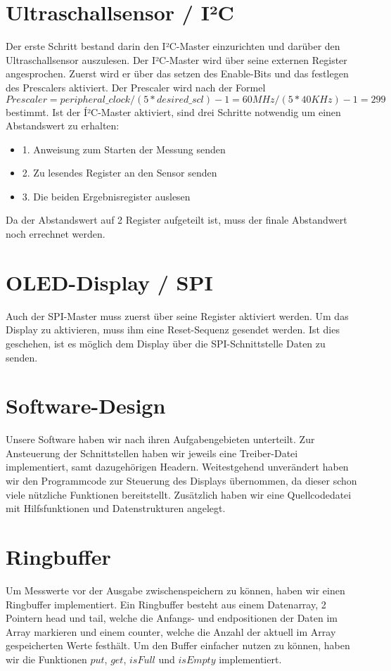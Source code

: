 \documentclass[parskip,
							 oneside,
							 11pt,
							 noheadingspace,
							 accentcolor=tud1d,
							 bigchapter,
							 colorback]{tudreport}
\begin{document}
\section{Ultraschallsensor / I²C}
Der erste Schritt bestand darin den I²C-Master einzurichten und darüber den Ultraschallsensor auszulesen. 
Der I²C-Master wird über seine externen Register angesprochen. Zuerst wird er über das setzen des Enable-Bits und das festlegen des Prescalers aktiviert. Der Prescaler wird nach der Formel $Prescaler = peripheral\_clock / (5 * desired\_scl) - 1 = 60 MHz / (5 * 40 KHz) - 1 = 299$ bestimmt. Ist der Í²C-Master aktiviert, sind drei Schritte notwendig um einen Abstandswert zu erhalten: 
\begin{itemize}
\item 1. Anweisung zum Starten der Messung senden
\item 2. Zu lesendes Register an den Sensor senden
\item 3. Die beiden Ergebnisregister auslesen
\end{itemize}
Da der Abstandswert auf 2 Register aufgeteilt ist, muss der finale Abstandwert noch errechnet werden.

\section{OLED-Display / SPI}
Auch der SPI-Master muss zuerst über seine Register aktiviert werden. Um das Display zu aktivieren, muss ihm eine Reset-Sequenz gesendet werden. Ist dies geschehen, ist es möglich dem Display über die SPI-Schnittstelle Daten zu senden.  


\section{Software-Design}

Unsere Software haben wir nach ihren Aufgabengebieten unterteilt. Zur Ansteuerung der Schnittstellen haben wir jeweils eine Treiber-Datei implementiert, samt dazugehörigen Headern. Weitestgehend unverändert haben wir den Programmcode zur Steuerung des Displays übernommen, da dieser schon viele nützliche Funktionen bereitstellt. Zusätzlich haben wir eine Quellcodedatei mit Hilfsfunktionen und Datenstrukturen angelegt. 

\section{Ringbuffer} 
Um Messwerte vor der Ausgabe zwischenspeichern zu können, haben wir einen Ringbuffer implementiert. Ein Ringbuffer besteht aus einem Datenarray, 2 Pointern head und tail, welche die Anfangs- und endpositionen der Daten im Array markieren und einem counter, welche die Anzahl der aktuell im Array gespeicherten Werte festhält. Um den Buffer einfacher nutzen zu können, haben wir die Funktionen $put$, $get$, $isFull$ und $isEmpty$ implementiert. 
\end{document}
